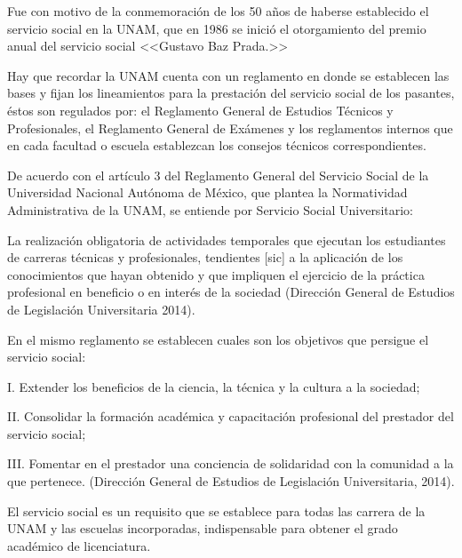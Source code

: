 Fue con motivo de la conmemoración de los 50 años de haberse establecido el
servicio social en la UNAM, que en 1986 se inició el otorgamiento del
premio anual del servicio social <<Gustavo Baz Prada.>>


Hay que recordar la UNAM  cuenta con un reglamento en donde se establecen
las bases y fijan los lineamientos para la prestación del servicio social
de los pasantes, éstos son regulados por: el  Reglamento General de
Estudios Técnicos y Profesionales, el Reglamento General de Exámenes y  los
reglamentos internos que en cada facultad o escuela establezcan  los
consejos técnicos correspondientes.


De acuerdo con el artículo 3 del Reglamento General del Servicio Social de
la Universidad Nacional Autónoma de México, que plantea la Normatividad
Administrativa de la UNAM, se entiende por Servicio Social Universitario: 

La realización obligatoria de actividades temporales que ejecutan los
estudiantes de carreras técnicas y profesionales, tendientes [sic] a la
aplicación de los conocimientos que hayan obtenido y que impliquen el
ejercicio de la práctica profesional en beneficio o en interés de la
sociedad (Dirección General de Estudios de Legislación Universitaria
2014). 
\newpage

En el mismo reglamento se establecen cuales son los objetivos que persigue
el servicio social:

\begin{Obs}
\item[I.] Extender los beneficios de la ciencia, la técnica y la cultura a la
sociedad; 
\item[II.] Consolidar la formación académica y capacitación profesional del
prestador del servicio social; 
\item[III.] Fomentar en el prestador una conciencia de solidaridad con la comunidad
a la que pertenece. (Dirección General de Estudios de Legislación
Universitaria, 2014). 
\end{Obs}


El servicio social es un requisito que se establece para todas las carrera
de la UNAM y las escuelas incorporadas, indispensable para obtener el grado
académico de licenciatura.

